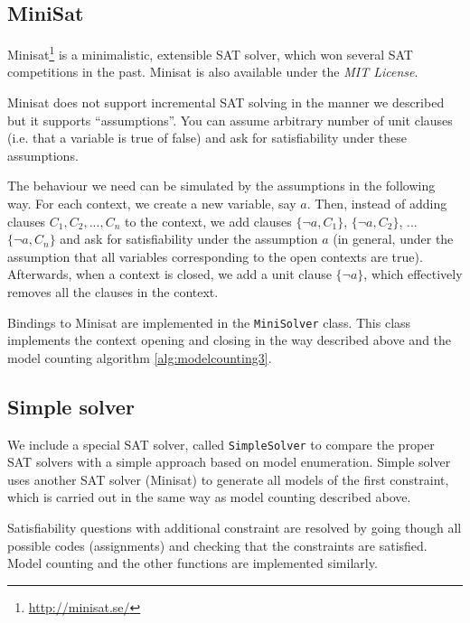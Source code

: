 \subsection{MiniSat}

Minisat\footnote{\url{http://minisat.se/}} \cite{minisat} is a minimalistic,
  extensible SAT solver, which won several SAT competitions in the past.
Minisat is also available under the \emph{MIT License}.

Minisat does not support incremental SAT solving in the manner we described
  but it supports ``assumptions''.
You can assume arbitrary number of unit clauses
  (i.e. that a variable is true of false) and ask for satisfiability under
  these assumptions.

The behaviour we need can be simulated by the assumptions in the following way.
For each context, we create a new variable, say $a$.
Then, instead of adding clauses $C_1, C_2, ..., C_n$ to the context,
  we add clauses $\{\neg a, C_1\}$, $\{\neg a, C_2\}$, ... $\{\neg a, C_n\}$ and ask
  for satisfiability under the assumption $a$ (in general,
  under the assumption that all variables corresponding
  to the open contexts are true).
Afterwards, when a context is closed, we add a unit clause $\{\neg a\}$,
  which effectively removes all the clauses in the context.

Bindings to Minisat are implemented in the \texttt{MiniSolver} class.
This class implements the context opening and closing in the way described above
  and the model counting algorithm \ref{alg:modelcounting3}.

\subsection{Simple solver}

We include a special SAT solver, called \texttt{SimpleSolver} to
  compare the proper SAT solvers with a simple approach based on model enumeration.
Simple solver uses another SAT solver (Minisat) to generate all
  models of the first constraint, which is carried out in the same way
  as model counting described above.

Satisfiability questions with additional constraint are
  resolved by going though all possible codes (assignments) and
  checking that the constraints are satisfied.
Model counting and the other functions are implemented similarly.

